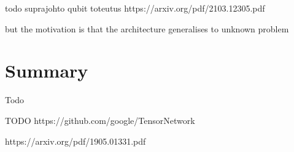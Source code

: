 todo suprajohto qubit toteutus
https://arxiv.org/pdf/2103.12305.pdf




but the motivation is that the architecture generalises to unknown problem

\section{Summary}

Todo





TODO https://github.com/google/TensorNetwork

https://arxiv.org/pdf/1905.01331.pdf


\newpage
\pagestyle{plain}
\renewcommand*{\bibfont}{\footnotesize}
\printbibliography{}



